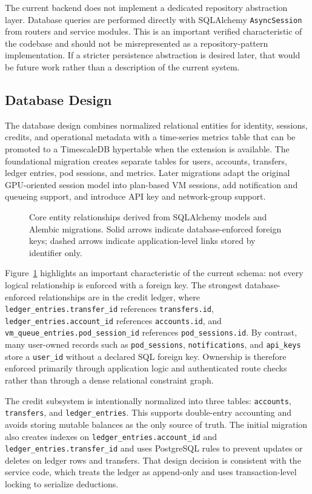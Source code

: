 \documentclass[12pt,a4paper]{article}
\begin{document}
The current backend does not implement a dedicated repository abstraction layer. Database queries are performed directly with SQLAlchemy \texttt{AsyncSession} from routers and service modules. This is an important verified characteristic of the codebase and should not be misrepresented as a repository-pattern implementation. If a stricter persistence abstraction is desired later, that would be future work rather than a description of the current system.

\subsection{Database Design}
The database design combines normalized relational entities for identity, sessions, credits, and operational metadata with a time-series metrics table that can be promoted to a TimescaleDB hypertable when the extension is available. The foundational migration creates separate tables for users, accounts, transfers, ledger entries, pod sessions, and metrics. Later migrations adapt the original GPU-oriented session model into plan-based VM sessions, add notification and queueing support, and introduce API key and network-group support.

\begin{figure}[!htbp]
    \centering
    \resizebox{\textwidth}{!}{}
    \caption{Core entity relationships derived from SQLAlchemy models and Alembic migrations. Solid arrows indicate database-enforced foreign keys; dashed arrows indicate application-level links stored by identifier only.}
    \label{fig:hopper-core-erd}
\end{figure}

Figure~\ref{fig:hopper-core-erd} highlights an important characteristic of the current schema: not every logical relationship is enforced with a foreign key. The strongest database-enforced relationships are in the credit ledger, where \texttt{ledger\_entries.transfer\_id} references \texttt{transfers.id}, \texttt{ledger\_entries.account\_id} references \texttt{accounts.id}, and \texttt{vm\_queue\_entries.pod\_session\_id} references \texttt{pod\_sessions.id}. By contrast, many user-owned records such as \texttt{pod\_sessions}, \texttt{notifications}, and \texttt{api\_keys} store a \texttt{user\_id} without a declared SQL foreign key. Ownership is therefore enforced primarily through application logic and authenticated route checks rather than through a dense relational constraint graph.

The credit subsystem is intentionally normalized into three tables: \texttt{accounts}, \texttt{transfers}, and \texttt{ledger\_entries}. This supports double-entry accounting and avoids storing mutable balances as the only source of truth. The initial migration also creates indexes on \texttt{ledger\_entries.account\_id} and \texttt{ledger\_entries.transfer\_id} and uses PostgreSQL rules to prevent updates or deletes on ledger rows and transfers. That design decision is consistent with the service code, which treats the ledger as append-only and uses transaction-level locking to serialize deductions.
\end{document}
